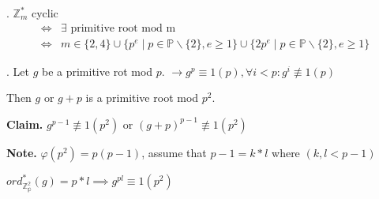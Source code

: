 \Theorem.
$\mathbb{Z}_m^{*}$ cyclic  
\begin{align*}
  \Leftrightarrow 
    &\exists \text{ primitive root mod m} \\
  \Leftrightarrow 
    &m \in \{2,4\} \cup \{ p^e \mid p \in \mathbb{P} \backslash \{2\}, e \geq 1 \} \cup \{ 2p^e \mid p \in \mathbb{P} \backslash \{2\}, e \geq 1 \}
\end{align*}

\Proof.
Let $g$ be a primitive rot mod $p$. $\rightarrow g^p \equiv 1 (p), \forall i < p : g^i \not\equiv 1 (p) $

Then $g$ or $g+p$ is a primitive root mod $p^2$.


\textbf{Claim.}
$g^{p-1} \not\equiv 1 (p^2)$ or $(g+p)^{p-1} \not\equiv 1 (p^2)$

\textbf{Note.}
$\varphi(p^2) = p(p-1)$, assume that $p-1 = k*l$ where $(k, l < p-1)$

$ord_{\mathbb{Z_p^2}}^{*}(g) = p*l \implies g^{pl} \equiv 1 (p^2)$



